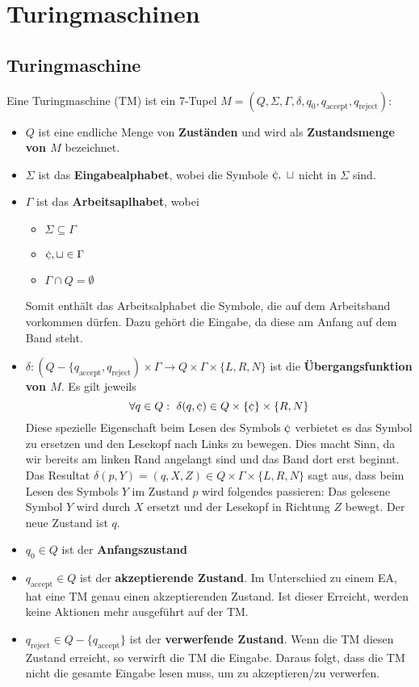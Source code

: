 \chapter{Turingmaschinen}
\section{Turingmaschine}
\begin{definition}
Eine Turingmaschine (TM) ist ein 7-Tupel \(M = (Q, \Sigma, \Gamma, \delta, q_0, q_\text{accept}, q_\text{reject})\):
\begin{itemize}
  \item \(Q\) ist eine endliche Menge von \textbf{Zuständen} und wird als \textbf{Zustandsmenge von \(M\)} bezeichnet.
  \item \(\Sigma\) ist das \textbf{Eingabealphabet}, wobei die Symbole \(\stopsym,\ \emptysym\) nicht in \(\Sigma\) sind.
  \item \(\Gamma\) ist das \textbf{Arbeitsaplhabet}, wobei
    \begin{itemize}
      \item \(\Sigma \subseteq \Gamma\)
      \item \(\stopsym, \emptysym \in \Gamma\)
      \item \(\Gamma \cap Q = \emptyset\)
    \end{itemize}
    Somit enthält das Arbeitsalphabet die Symbole, die auf dem Arbeitsband vorkommen dürfen. Dazu gehört die Eingabe, da diese am Anfang auf dem Band steht.
  \item \( \delta: (Q - \{q_\text{accept}, q_\text{reject}) \times \Gamma \to Q \times \Gamma \times \{L, R, N\}\) ist die \textbf{Übergangsfunktion von \(M\)}. Es gilt jeweils \[ \forall q \in Q:\ \delta(q, \stopsym) \in Q \times \{\stopsym\} \times \{R, N\}\]
  Diese spezielle Eigenschaft beim Lesen des Symbols \(\stopsym\) verbietet es das Symbol zu ersetzen und den Lesekopf nach Links zu bewegen. Dies macht Sinn, da wir bereits am linken Rand angelangt sind und das Band dort erst beginnt.\\ Das Resultat \(\delta(p, Y) = (q, X, Z) \in Q \times \Gamma \times \{L, R, N\}\) sagt aus, dass beim Lesen des Symbols \(Y\) im Zustand \(p\) wird folgendes passieren: Das gelesene Symbol \(Y\) wird durch \(X\) ersetzt und der Lesekopf in Richtung \(Z\) bewegt. Der neue Zustand ist \(q\).
  \item \(q_0 \in Q\) ist der \textbf{Anfangszustand}
  \item \(q_\text{accept} \in Q\) ist der \textbf{akzeptierende Zustand}. Im Unterschied zu einem EA, hat eine TM genau einen akzeptierenden Zustand. Ist dieser Erreicht, werden keine Aktionen mehr ausgeführt auf der TM.
  \item \(q_\text{reject} \in Q - \{q_\text{accept}\}\) ist der \textbf{verwerfende Zustand}. Wenn die TM diesen Zustand erreicht, so verwirft die TM die Eingabe. Daraus folgt, dass die TM nicht die gesamte Eingabe lesen muss, um zu akzeptieren/zu verwerfen.\\
\end{itemize}

\end{definition}

